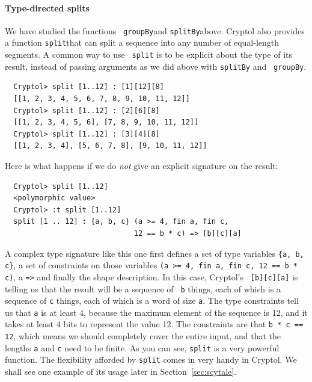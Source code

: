 \paragraph*{Type-directed splits} We have studied the functions {\tt
  groupBy}\indGroup and {\tt splitBy}\indSplitBy above.  Cryptol also
provides a function {\tt split}\indSplit that can split a sequence
into any number of equal-length segments.  A common way to use {\tt
  split} is to be explicit about the type of its result, instead of
passing arguments as we did above with {\tt splitBy} and {\tt
  groupBy}.
\begin{Verbatim}
  Cryptol> split [1..12] : [1][12][8]
  [[1, 2, 3, 4, 5, 6, 7, 8, 9, 10, 11, 12]]
  Cryptol> split [1..12] : [2][6][8]
  [[1, 2, 3, 4, 5, 6], [7, 8, 9, 10, 11, 12]]
  Cryptol> split [1..12] : [3][4][8]
  [[1, 2, 3, 4], [5, 6, 7, 8], [9, 10, 11, 12]]
\end{Verbatim}
Here is what happens if we do {\em not} give an explicit signature on
the result:\indSignature
\begin{Verbatim}
  Cryptol> split [1..12]
  <polymorphic value>
  Cryptol> :t split [1..12]
  split [1 .. 12] : {a, b, c} (a >= 4, fin a, fin c,
                              12 == b * c) => [b][c][a]
\end{Verbatim}

A complex type signature like this one first defines a set of type
variables {\tt \Verb|{a, b, c}|}, a set of constraints on those
variables {\tt \Verb|(a >= 4, fin a, fin c, 12 == b * c)|}, a {\tt =>}
and finally the shape description.  In this case, Cryptol's {\tt
  [b][c][a]} is telling us that the result will be a sequence of {\tt
  b} things, each of which is a sequence of {\tt c} things, each of
which is a word of size {\tt a}. The type constraints tell us that
{\tt a} is at least 4, because the maximum element of the sequence is 12,
and it takes at least 4 bits to represent the value 12.  The
constraints are that {\tt b * c == 12}, which means we should
completely cover the entire input, and that the lengths {\tt a} and
{\tt c} need to be finite.  As you can see, {\tt split} is a very
powerful function. The flexibility afforded by {\tt split} comes in
very handy in Cryptol.  We shall see one example of its usage later in
Section~\ref{sec:scytale}.

